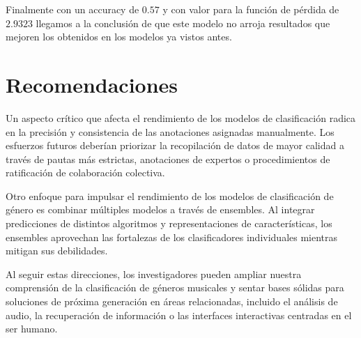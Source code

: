 \documentclass[colorinlistoftodos,twoside,twocolumn,10pt]{article} %
\begin{document}
Finalmente con un accuracy de $0.57$ y con valor para la funci\'on de p\'erdida de  $2.9323$ llegamos a la conclusi\'on de que este modelo no arroja resultados que mejoren los obtenidos en los modelos ya vistos antes.

	\section{Recomendaciones}
  
Un aspecto crítico que afecta el rendimiento de los modelos de clasificación radica en la precisión y consistencia de las anotaciones asignadas manualmente. Los esfuerzos futuros deberían priorizar la recopilación de datos de mayor calidad a través de pautas más estrictas, anotaciones de expertos o procedimientos de ratificación de colaboración colectiva.

Otro enfoque para impulsar el rendimiento de los modelos de clasificación de género es combinar múltiples modelos a través de ensembles. Al integrar predicciones de distintos algoritmos y representaciones de características, los ensembles aprovechan las fortalezas de los clasificadores individuales mientras mitigan sus debilidades.  

  Al seguir estas direcciones, los investigadores pueden ampliar nuestra comprensión de la clasificación de géneros musicales y sentar bases sólidas para soluciones de próxima generación en áreas relacionadas, incluido el análisis de audio, la recuperación de información o las interfaces interactivas centradas en el ser humano.
  
\end{document}
